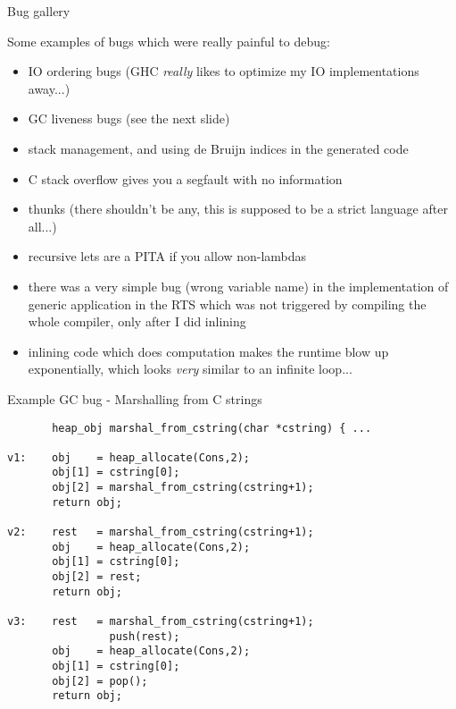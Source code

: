 \documentclass{beamer}
\begin{document}

\begin{frame}{Bug gallery}

{\small
Some examples of bugs which were really painful to debug:

\begin{itemize}
\item IO ordering bugs (GHC \emph{really} likes to optimize my IO implementations away...)
\item GC liveness bugs (see the next slide)
\item stack management, and using de Bruijn indices in the generated code
\item C stack overflow gives you a segfault with no information
\item thunks (there shouldn't be any, this is supposed to be a strict language after all...)
\item recursive lets are a PITA if you allow non-lambdas
\item there was a very simple bug (wrong variable name) in the implementation of generic
application in the RTS which was not triggered by compiling the whole compiler, only
after I did inlining
\item inlining code which does computation makes the runtime blow up exponentially,
      which looks \emph{very} similar to an infinite loop...
\end{itemize}
}

\end{frame}


\begin{frame}[fragile]{Example GC bug - Marshalling from C strings}

{\footnotesize
\begin{verbatim}
       heap_obj marshal_from_cstring(char *cstring) { ...
       
v1:    obj    = heap_allocate(Cons,2);
       obj[1] = cstring[0];
       obj[2] = marshal_from_cstring(cstring+1);
       return obj;
       
v2:    rest   = marshal_from_cstring(cstring+1);
       obj    = heap_allocate(Cons,2);
       obj[1] = cstring[0];
       obj[2] = rest;
       return obj;
       
v3:    rest   = marshal_from_cstring(cstring+1);
                push(rest);
       obj    = heap_allocate(Cons,2);
       obj[1] = cstring[0];
       obj[2] = pop();
       return obj;
\end{verbatim}
}

\end{frame}
\end{document}
